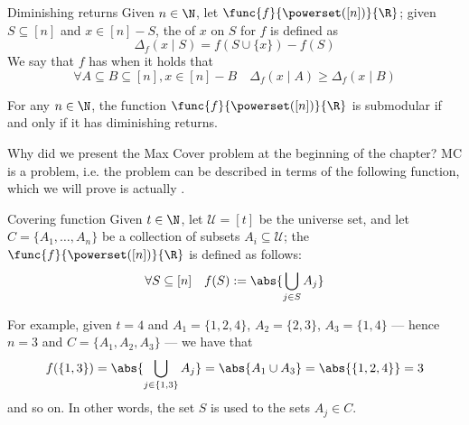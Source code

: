 \documentclass[a4paper, 12pt]{report}
\begin{document}
    \begin{frameddefn}{Diminishing returns}
        Given $n \in \N$, let $\func{f}{\powerset([n])}{\R}$; given $S \subseteq [n]$ and $x \in [n] - S$, the  of $x$ on $S$ for $f$ is defined as $$\Delta_f(x \mid S) = f(S \cup \{x\}) - f(S)$$ We say that $f$ has  when it holds that $$\forall A \subseteq B \subseteq [n], x \in [n] - B \quad \Delta_f(x \mid A) \ge \Delta_f(x \mid B)$$
    \end{frameddefn}

    \begin{framedthm}[label={submodular returns}]{}
        For any $n \in \N$, the function $\func{f}{\powerset([n])}{\R}$ is submodular if and only if it has diminishing returns.
    \end{framedthm}


    Why did we present the Max Cover problem at the beginning of the chapter? MC is a  problem, i.e. the problem can be described in terms of the following function, which we will prove is actually .

    \begin{frameddefn}{Covering function}
        Given $t \in \N$, let $\mathcal U = [t]$ be the universe set, and let $C = \{A_1, \ldots, A_n\}$ be a collection of subsets $A_i \subseteq \mathcal U$; the  $\func{f}{\powerset([n])}{\R}$ is defined as follows: $$\forall S \subseteq [n] \quad f(S) := \abs{\bigcup_{j \in S}{A_j}}$$
    \end{frameddefn}

    For example, given $t = 4$ and $A_1 = \{1, 2, 4\}$, $A_2 = \{2, 3\}$, $A_3 = \{1, 4\}$ --- hence $n = 3$ and $C = \{A_1, A_2, A_3\}$ --- we have that $$f(\{1, 3\}) = \abs{\bigcup_{j \in \{1, 3\}}{A_j}} = \abs{A_1 \cup A_3} = \abs{\{1, 2, 4\}} = 3$$ and so on. In other words, the set $S$ is used to  the sets $A_j \in C$.
\end{document}

